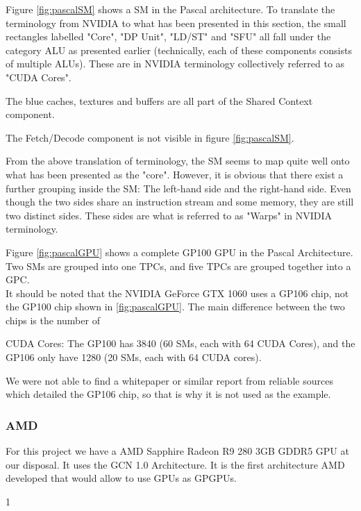 Figure \ref{fig:pascalSM} shows a \gls{SM} in the Pascal architecture.
To translate the terminology from NVIDIA to what has been presented in this section, the small rectangles labelled "Core", "DP Unit", "LD/ST" and "SFU" all fall under the category \gls{ALU} as presented earlier (technically, each of these components consists of multiple \glspl{ALU}).
These are in NVIDIA terminology collectively referred to as "CUDA Cores".

The blue caches, textures and buffers are all part of the Shared Context component.

The Fetch/Decode component is not visible in figure \ref{fig:pascalSM}.

From the above translation of terminology, the \gls{SM} seems to map quite well onto what has been presented as the "core".
However, it is obvious that there exist a further grouping inside the \gls{SM}: The left-hand side and the right-hand side.
Even though the two sides share an instruction stream and some memory, they are still two distinct sides.
These sides are what is referred to as "Warps" in NVIDIA terminology.


Figure \ref{fig:pascalGPU} shows a complete GP100 GPU in the Pascal Architecture.
Two \glspl{SM} are grouped into one \glspl{TPC}, and five \glspl{TPC} are grouped together into a \gls{GPC}. \\

It should be noted that the NVIDIA GeForce GTX 1060 uses a GP106 chip, not the GP100 chip shown in \ref{fig:pascalGPU}. 
The main difference between the two chips is the number of {CUDA Cores: The GP100 has 3840 (60 \glspl{SM}, each with 64 CUDA Cores), and the GP106 only have 1280 (20 \glspl{SM}, each with 64 CUDA cores).

We were not able to find a whitepaper or similar report from reliable sources which detailed the GP106 chip, so that is why it is not used as the example. 


\subsubsection{AMD}
For this project we have a AMD Sapphire Radeon R9 280 3GB GDDR5 \gls{GPU} at our disposal. It uses the \gls{GCN} 1.0 Architecture.
It is the first architecture AMD developed that would allow to use \glspl{GPU} as \glspl{GPGPU}.

}{1} 


